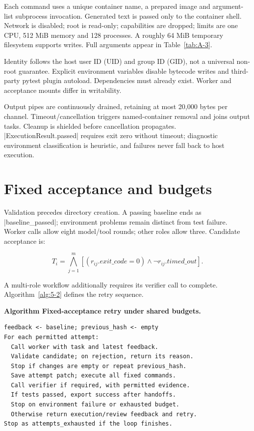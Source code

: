 Each command uses a unique container name, a prepared image and argument-list subprocess invocation. Generated text is passed only to the container shell. Network is disabled; root is read-only; capabilities are dropped; limits are one CPU, 512 MiB memory and 128 processes. A roughly 64 MiB temporary filesystem supports writes. Full arguments appear in Table~\ref{tab:A-3}.

Identity follows the host user ID (UID) and group ID (GID), not a universal non-root guarantee. Explicit environment variables disable bytecode writes and third-party pytest plugin autoload. Dependencies must already exist. Worker and acceptance mounts differ in writability.

Output pipes are continuously drained, retaining at most 20,000 bytes per channel. Timeout/cancellation triggers named-container removal and joins output tasks. Cleanup is shielded before cancellation propagates. \code|ExecutionResult.passed| requires exit zero without timeout; diagnostic environment classification is heuristic, and failures never fall back to host execution.

\section{Fixed acceptance and budgets}\label{sec:5.4}

Validation precedes directory creation. A passing baseline ends as \code|baseline_passed|; environment problems remain distinct from test failure. Worker calls allow eight model/tool rounds; other roles allow three. Candidate acceptance is:

\begin{equation}
T_i=\bigwedge_{j=1}^{m}
[(r_{ij}.exit\_code=0)\land\neg r_{ij}.timed\_out].\label{eq:5-2}
\end{equation}

A multi-role workflow additionally requires its verifier call to complete. Algorithm~\ref{alg:5-2} defines the retry sequence.

\label{alg:5-2}
\noindent\textbf{Algorithm \thethesisalgorithm\quad Fixed-acceptance retry under shared budgets.}\par\nopagebreak

\begin{Verbatim}[fontsize=\normalsize,breaklines=true,breakanywhere=true,frame=single,framesep=2mm]
feedback <- baseline; previous_hash <- empty
For each permitted attempt:
  Call worker with task and latest feedback.
  Validate candidate; on rejection, return its reason.
  Stop if changes are empty or repeat previous_hash.
  Save attempt patch; execute all fixed commands.
  Call verifier if required, with permitted evidence.
  If tests passed, export success after handoffs.
  Stop on environment failure or exhausted budget.
  Otherwise return execution/review feedback and retry.
Stop as attempts_exhausted if the loop finishes.
\end{Verbatim}

